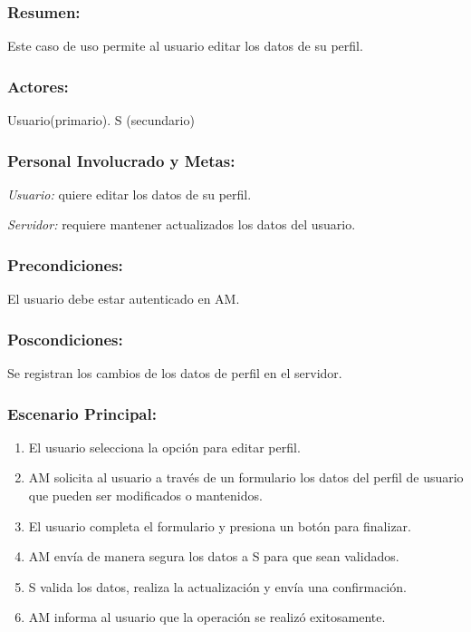 \begin{framed}


\subsubsection{Resumen:} Este caso de uso permite al usuario editar los datos de su perfil.


\subsubsection{Actores:} Usuario(primario). S (secundario)

\subsubsection{Personal Involucrado y Metas:}

\emph{Usuario:} quiere editar los datos de su perfil.

\emph{Servidor:} requiere mantener actualizados los datos del usuario.

\subsubsection{Precondiciones:} 
El usuario debe estar autenticado en AM. 

\subsubsection{Poscondiciones:} 
Se registran los cambios de los datos de perfil en el servidor.

\subsubsection{Escenario Principal: }

\begin{enumerate}
    \item El usuario selecciona la opción para editar perfil. 
    \item AM solicita al usuario a través de un formulario los datos del perfil de usuario que pueden ser modificados o mantenidos.
    \item El usuario completa el formulario y presiona un botón para finalizar.
    \item AM envía de manera segura los datos a S para que sean validados.
    \item S valida los datos, realiza la actualización y envía una confirmación.
    \item AM informa al usuario que la operación se realizó exitosamente.
\end{enumerate}


\end{framed}
